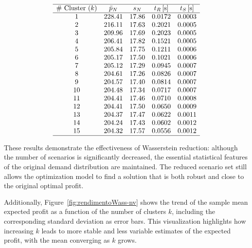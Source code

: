 \documentclass[a4paper,12pt]{article}
\begin{document}
	\[
	\begin{array}{ccccc}
		\hline
		\text{\# Cluster $(k)$} & \text{$\bar{p}_{N}$} & \text{$s_{N}$} & \text{$t_{R}$\,[s]} & \text{$t_{S}$\,[s]} \\
		\hline
		1 & 228.41 & 17.86 & 0.0172 & 0.0003 \\
		2 & 216.11 & 17.63 & 0.2021 & 0.0005 \\
		3 & 209.96 & 17.69 & 0.2023 & 0.0005 \\
		4 & 206.41 & 17.82 & 0.1521 & 0.0005 \\
		5 & 205.84 & 17.75 & 0.1211 & 0.0006 \\
		6 & 205.17 & 17.50 & 0.1021 & 0.0006 \\
		7 & 205.12 & 17.29 & 0.0945 & 0.0007 \\
		8 & 204.61 & 17.26 & 0.0826 & 0.0007 \\
		9 & 204.57 & 17.40 & 0.0814 & 0.0007 \\
		10 & 204.48 & 17.34 & 0.0717 & 0.0007 \\
		11 & 204.41 & 17.46 & 0.0710 & 0.0008 \\
		12 & 204.41 & 17.50 & 0.0650 & 0.0009 \\
		13 & 204.37 & 17.47 & 0.0622 & 0.0011 \\
		14 & 204.24 & 17.43 & 0.0602 & 0.0012 \\
		15 & 204.32 & 17.57 & 0.0556 & 0.0012 \\
		\hline
	\end{array}
	\]
	
	
	\label{tab:wass-nv-results}
	
	
	\noindent These results demonstrate the effectiveness of Wasserstein reduction: although the number of scenarios is significantly decreased, the essential statistical features of the original demand distribution are maintained. The reduced scenario set still allows the optimization model to find a solution that is both robust and close to the original optimal profit.
	
	\noindent
	Additionally, Figure~\ref{fig:rendimentoWass-nv} shows the trend of the sample mean expected profit as a function of the number of clusters $k$, including the corresponding standard deviation as error bars. This visualization highlights how increasing $k$ leads to more stable and less variable estimates of the expected profit, with the mean converging as $k$ grows.
	
\end{document}
